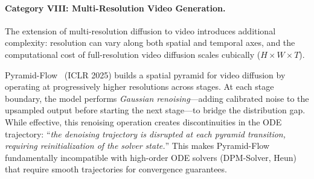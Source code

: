 %



\paragraph{Category VIII: Multi-Resolution Video Generation.}
The extension of multi-resolution diffusion to video introduces additional complexity: resolution can vary along both spatial and temporal axes, and the computational cost of full-resolution video diffusion scales cubically ($H \times W \times T$).

Pyramid-Flow~\citep{jin2024pyramidflow} (ICLR 2025) builds a spatial pyramid for video diffusion by operating at progressively higher resolutions across stages.
At each stage boundary, the model performs \emph{Gaussian renoising}---adding calibrated noise to the upsampled output before starting the next stage---to bridge the distribution gap.
While effective, this renoising operation creates discontinuities in the ODE trajectory: ``\emph{the denoising trajectory is disrupted at each pyramid transition, requiring reinitialization of the solver state.}''
This makes Pyramid-Flow fundamentally incompatible with high-order ODE solvers (DPM-Solver, Heun) that require smooth trajectories for convergence guarantees.


